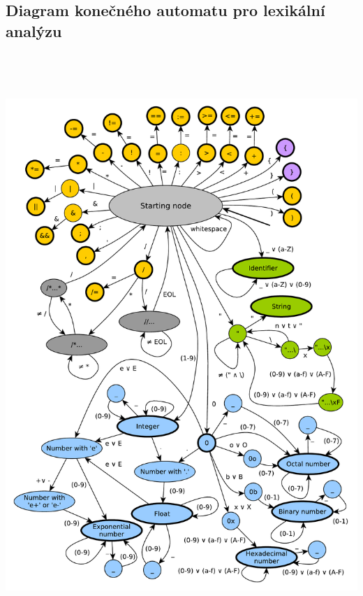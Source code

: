 \documentclass[11pt]{article}
\begin{document}
\subsection{Diagram konečného automatu pro lexikální analýzu}
\label{sec:fa}
	\includegraphics[width=\textwidth, height=22cm]{img/scanner_FA.pdf}\par\vspace{1cm}
    \newpage
    
\end{document}
